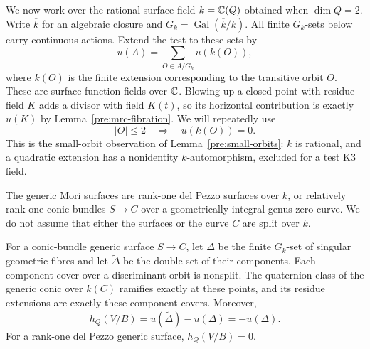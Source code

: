 We now work over the rational surface field $k=\mathbb C(Q)$ obtained when
$\dim Q=2$.  Write $\overline k$ for an algebraic closure and
$G_k=\operatorname{Gal}(\overline k/k)$.  All finite $G_k$-sets below carry
continuous actions.  Extend the test to these sets by
\begin{equation}\label{sl:orbit-test}
 u(A)=\sum_{O\in A/G_k}u(k(O)),
\end{equation}
where $k(O)$ is the finite extension corresponding to the transitive orbit
$O$.  These are surface function fields over $\mathbb C$.  Blowing up a closed point
with residue field $K$ adds a divisor with field $K(t)$, so its horizontal
contribution is exactly $u(K)$ by Lemma~\ref{pre:mrc-fibration}.
We will repeatedly use
\begin{equation}\label{sl:small-orbits}
 |O|\leq2\quad\Longrightarrow\quad u(k(O))=0.
\end{equation}
This is the small-orbit observation of Lemma~\ref{pre:small-orbits}:
$k$ is rational, and a quadratic extension has a nonidentity
$k$-automorphism, excluded for a test K3 field.

The generic Mori surfaces are rank-one del Pezzo surfaces over $k$, or
relatively rank-one conic bundles $S\to C$ over a geometrically integral
genus-zero curve.  We do not assume that either the surfaces or the curve
$C$ are split over $k$.

\begin{lemma}
\label{sl:conic-h}
For a conic-bundle generic surface $S\to C$, let $\Delta$ be the finite
$G_k$-set of singular geometric fibres and let $\widetilde\Delta$ be the
double set of their components.  Each component cover over a discriminant
orbit is nonsplit.  The quaternion class of the generic conic over $k(C)$
ramifies exactly at these points, and its residue extensions are exactly
these component covers.  Moreover,
\begin{equation}\label{sl:h-discriminant}
 h_Q(V/B)=u(\widetilde\Delta)-u(\Delta)=-u(\Delta).
\end{equation}
For a rank-one del Pezzo generic surface, $h_Q(V/B)=0$.
\end{lemma}

